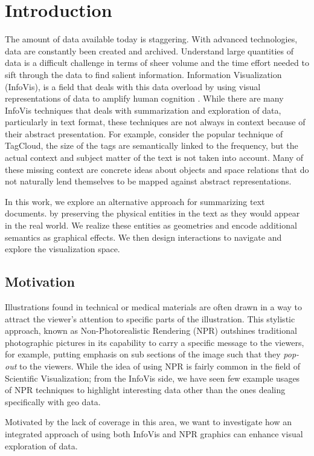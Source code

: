 \chapter{Introduction}
The amount of data available today is staggering. With advanced technologies,
data are constantly been created and archived. Understand large quantities of data is
a difficult challenge in terms of sheer volume and the time effort needed to
sift through the data to find salient information. Information Visualization
(InfoVis), is a field that deals with this data overload by using visual
representations of data to amplify human cognition \cite{Card1999}. While there
are many InfoVis techniques that deals with summarization and exploration of
data, particularly in text format, these techniques are not always in context
because of their abstract presentation. For example, consider the popular
technique of TagCloud, the size of the tags are semantically linked to the
frequency, but the actual context and subject matter of the text is not taken
into account. Many of these missing context are concrete ideas about objects and
space relations that do not naturally lend themselves to be mapped against
abstract representations.
 
In this work, we explore an alternative approach for summarizing text documents.
by preserving the physical entities in the text as they would appear in the real
world. We realize these entities as \threed geometries and encode additional
semantics as graphical effects. We then design interactions to navigate and
explore the \threed visualization space.
   
  
\section{Motivation}
Illustrations found in technical or medical materials are often drawn in a way
to attract the viewer's attention to specific parts of the illustration. This
stylistic approach, known as Non-Photorealistic Rendering (NPR) outshines
traditional photographic pictures in its capability to carry a specific
message to the viewers, for example, putting emphasis on sub sections of the
image such that they \emph{pop-out} to the viewers. While the idea of using 
NPR is fairly common in the field of Scientific Visualization; from the 
InfoVis side, we have seen few example usages of NPR techniques to  highlight
interesting data other than the ones dealing specifically with geo data.
 
Motivated by the lack of coverage in this area, we want to investigate how an
integrated approach of using both InfoVis and NPR graphics can enhance visual
exploration of data.

